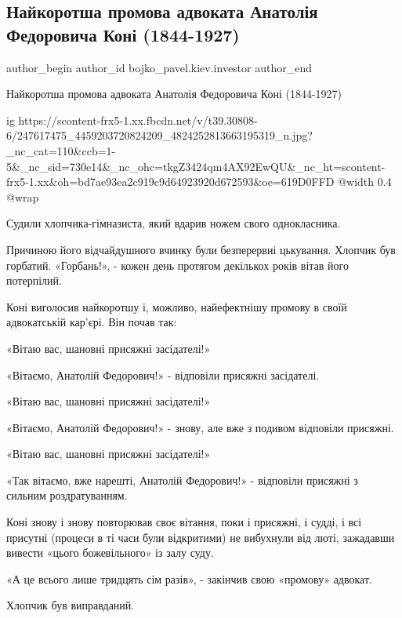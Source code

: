  
 
 
 
 
 
\subsection{Найкоротша промова адвоката Анатолія Федоровича Коні (1844-1927)}
\label{sec:25_10_2021.fb.bojko_pavel.kiev.investor.1.advokat_rechj_korotkaja}
 
\ifcmt
 author_begin
   author_id bojko_pavel.kiev.investor
 author_end
\fi

Найкоротша промова адвоката Анатолія Федоровича Коні (1844-1927)

\ifcmt
  ig https://scontent-frx5-1.xx.fbcdn.net/v/t39.30808-6/247617475_4459203720824209_4824252813663195319_n.jpg?_nc_cat=110&ccb=1-5&_nc_sid=730e14&_nc_ohc=tkgZ3424qm4AX92EwQU&_nc_ht=scontent-frx5-1.xx&oh=bd7ae93ea2c919c9d64923920d672593&oe=619D0FFD
  @width 0.4
  @wrap 
\fi

Судили хлопчика-гімназиста, який вдарив ножем свого однокласника.

Причиною його відчайдушного вчинку були безперервні цькування. Хлопчик був
горбатий. «Горбань!», - кожен день протягом декількох років вітав його
потерпілий.



Коні виголосив найкоротшу і, можливо, найефектнішу промову в своїй адвокатській
кар'єрі. Він почав так:

«Вітаю вас, шановні присяжні засідателі!»

«Вітаємо, Анатолій Федорович!» - відповіли присяжні засідателі.

«Вітаю вас, шановні присяжні засідателі!»

«Вітаємо, Анатолій Федорович!» - знову, але вже з подивом відповіли присяжні.

«Вітаю вас, шановні присяжні засідателі!»

«Так вітаємо, вже нарешті, Анатолій Федорович!» - відповіли присяжні з сильним
роздратуванням.

Коні знову і знову повторював своє вітання, поки і присяжні, і судді, і всі
присутні (процеси в ті часи були відкритими) не вибухнули від люті, зажадавши
вивести «цього божевільного» із залу суду.

«А це всього лише тридцять сім разів», - закінчив свою «промову» адвокат.

Хлопчик був виправданий.

